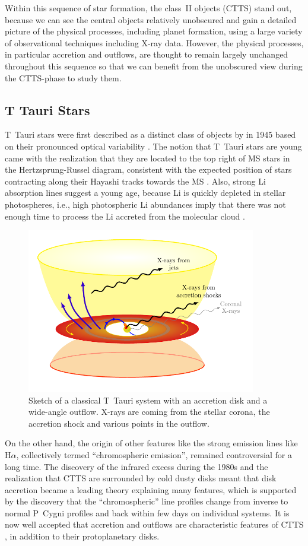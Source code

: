 \documentclass[graybox, nosecnum]{svmult}
\begin{document}
Within this sequence of star formation, the class~II objects (CTTS) stand out, because we can see the central objects relatively unobscured and gain a detailed picture of the physical processes, including planet formation, using a large variety of observational techniques including X-ray data. However, the physical processes, in particular accretion and outflows, are thought to remain largely unchanged throughout this sequence so that we can benefit from the unobscured view during the CTTS-phase to study them.

\subsection{T Tauri Stars}
T~Tauri stars were first described as a distinct class of objects  by \citeauthor{Joy_1945} in 1945 based on their pronounced optical variability \citep{Joy_1945}. The notion that T~Tauri stars are young came with the realization that they are located to the top right of  MS stars in the Hertzsprung-Russel diagram, consistent with the expected position of stars contracting along their Hayashi tracks towards the MS \citep{Hayashi_1961}. Also, strong Li absorption lines suggest a young age, because Li is quickly depleted in stellar photospheres, i.e., high photospheric Li abundances imply that there was not enough time to process the Li accreted from the molecular cloud \citep{Magazzu_1992}.
%
%
\begin{figure}[t]
\centering
\includegraphics[width=10cm]{sketches/ctts.pdf}
\caption{Sketch of a classical T~Tauri system with an accretion disk and a wide-angle outflow. X-rays are coming from the stellar corona, the accretion shock and various points in the outflow. \label{fig:ctts_sketch}}
\end{figure}
%
On the other hand, the origin of other features like the strong emission lines like H$\alpha$, collectively termed “chromospheric emission”, remained controversial for a long time. The discovery of the infrared excess during the 1980s and the realization that CTTS are surrounded by cold dusty disks meant that disk accretion became a leading theory explaining many features, which is supported by the discovery that the ``chromospheric'' line profiles change from inverse to normal P~Cygni profiles and back within few days on individual systems. It is now well accepted that accretion 
and outflows are characteristic features of CTTS \cite{Bertout_2007}, in addition to their protoplanetary disks.
\end{document}
